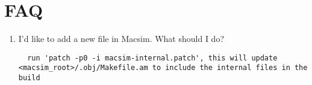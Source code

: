 \clearpage 
\section{FAQ}
\label{sec:faq}

\begin{enumerate}
\item I'd like to add a new file in Macsim. What should I do? 
\begin{verbatim}  run 'patch -p0 -i macsim-internal.patch', this will update <macsim_root>/.obj/Makefile.am to include the internal files in the build \end{verbatim}
\end{enumerate}
